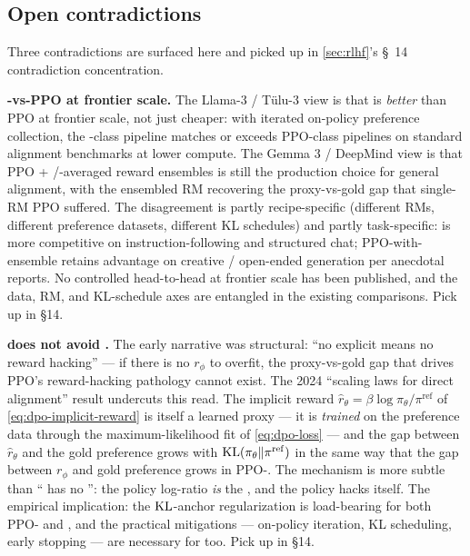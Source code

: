 \subsection{Open contradictions}
\label{sec:dpo-contradictions}

Three contradictions are surfaced here and picked up in \cref{sec:rlhf}'s
\S~14 contradiction concentration.

\begin{contradiction}
\textbf{-vs-PPO at frontier scale.} The Llama-3 / T\"ulu-3 view
\citep{meta-llama3, tulu3} is that  is \emph{better} than PPO at
frontier scale, not just cheaper: with iterated on-policy preference
collection, the -class pipeline matches or exceeds PPO-class
pipelines on standard alignment benchmarks at lower compute. The
Gemma 3 / DeepMind view \citep{gemma3, warm-2024, warp-2024} is that
PPO + /-averaged reward ensembles is still the production
choice for general alignment, with the ensembled RM recovering the
proxy-vs-gold gap that single-RM PPO suffered. The disagreement is
partly recipe-specific (different RMs, different preference datasets,
different KL schedules) and partly task-specific:  is more
competitive on instruction-following and structured chat;
PPO-with-ensemble retains advantage on creative / open-ended
generation per anecdotal reports. No controlled head-to-head at
frontier scale has been published, and the data, RM, and KL-schedule
axes are entangled in the existing comparisons. Pick up in \S 14.
\end{contradiction}

\begin{contradiction}
\textbf{ does not avoid .} The early 
narrative was structural: ``no explicit  means no reward
hacking'' --- if there is no $r_\phi$ to overfit, the proxy-vs-gold
gap that drives PPO's reward-hacking pathology cannot exist. The
2024 ``scaling laws for direct alignment'' result
 undercuts this read. The implicit
reward $\hat r_\theta = \beta \log \pi_\theta / \pi^{\mathrm{ref}}$ of
\cref{eq:dpo-implicit-reward} is itself a learned proxy --- it is
\emph{trained} on the preference data through the maximum-likelihood
fit of \cref{eq:dpo-loss} --- and the gap between $\hat r_\theta$ and
the gold preference grows with $\operatorname{KL}(\pi_\theta \| \pi^{\mathrm{ref}})$
in the same way that the gap between $r_\phi$ and gold preference
grows in PPO-. The mechanism is more subtle than `` has no
'': the policy log-ratio \emph{is} the , and
the policy hacks itself. The empirical implication: the
$\operatorname{KL}$-anchor regularization is load-bearing for both PPO- and
, and the practical mitigations --- on-policy iteration, KL
scheduling, early stopping --- are necessary for  too. Pick up
in \S 14.
\end{contradiction}

